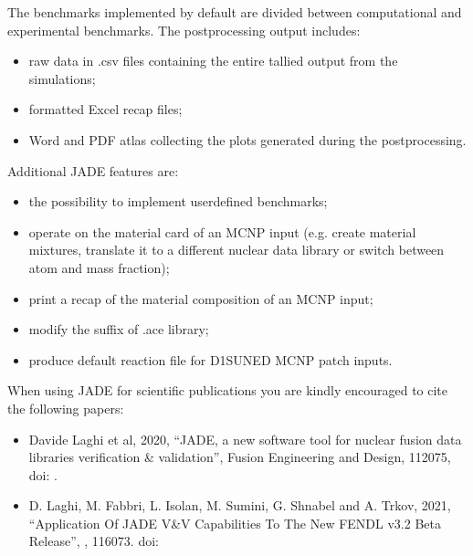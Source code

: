\documentclass[letterpaper,10pt,english]{sphinxmanual}
\begin{document}
\sphinxAtStartPar
The benchmarks implemented by default are divided between computational
and experimental benchmarks. The post\sphinxhyphen{}processing output includes:
\begin{itemize}
\item {} 
\sphinxAtStartPar
raw data in .csv files containing the entire tallied output from the
simulations;

\item {} 
\sphinxAtStartPar
formatted Excel recap files;

\item {} 
\sphinxAtStartPar
Word and PDF atlas collecting the plots generated during the post\sphinxhyphen{}processing.

\end{itemize}

\sphinxAtStartPar
Additional JADE features are:
\begin{itemize}
\item {} 
\sphinxAtStartPar
the possibility to implement user\sphinxhyphen{}defined benchmarks;

\item {} 
\sphinxAtStartPar
operate on the material card of an MCNP input (e.g. create material mixtures,
translate it to a different nuclear data library or switch between atom and
mass fraction);

\item {} 
\sphinxAtStartPar
print a recap of the material composition of an MCNP input;

\item {} 
\sphinxAtStartPar
modify the suffix of .ace library;

\item {} 
\sphinxAtStartPar
produce default reaction file for D1S\sphinxhyphen{}UNED MCNP patch inputs.

\end{itemize}

\sphinxAtStartPar
When using JADE for scientific publications you are kindly encouraged to cite the following papers:
\begin{itemize}
\item {} 
\sphinxAtStartPar
Davide Laghi et al, 2020, “JADE, a new software tool for nuclear fusion data libraries verification \& validation”,
Fusion Engineering and Design,  112075, doi: .

\item {} 
\sphinxAtStartPar
D. Laghi, M. Fabbri, L. Isolan, M. Sumini, G. Shnabel and A. Trkov, 2021,
“Application Of JADE V\&V Capabilities To The New FENDL v3.2 Beta Release”,
,  116073. doi: 

\end{itemize}
\end{document}
